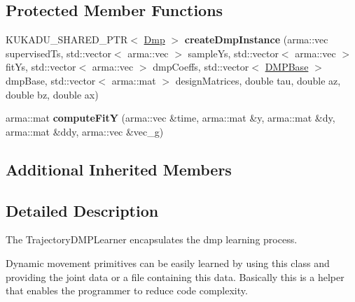 \subsection*{Protected Member Functions}
\begin{DoxyCompactItemize}
\item 
\hypertarget{classkukadu_1_1JointDMPLearner_ac16e6c7d24bbdf194663bdc61788d5ea}{K\-U\-K\-A\-D\-U\-\_\-\-S\-H\-A\-R\-E\-D\-\_\-\-P\-T\-R$<$ \hyperlink{classkukadu_1_1Dmp}{Dmp} $>$ {\bfseries create\-Dmp\-Instance} (arma\-::vec supervised\-Ts, std\-::vector$<$ arma\-::vec $>$ sample\-Ys, std\-::vector$<$ arma\-::vec $>$ fit\-Ys, std\-::vector$<$ arma\-::vec $>$ dmp\-Coeffs, std\-::vector$<$ \hyperlink{classkukadu_1_1DMPBase}{D\-M\-P\-Base} $>$ dmp\-Base, std\-::vector$<$ arma\-::mat $>$ design\-Matrices, double tau, double az, double bz, double ax)}\label{classkukadu_1_1JointDMPLearner_ac16e6c7d24bbdf194663bdc61788d5ea}

\item 
\hypertarget{classkukadu_1_1JointDMPLearner_a9d5c78a2aa1329efd24baf9fec767021}{arma\-::mat {\bfseries compute\-Fit\-Y} (arma\-::vec \&time, arma\-::mat \&y, arma\-::mat \&dy, arma\-::mat \&ddy, arma\-::vec \&vec\-\_\-g)}\label{classkukadu_1_1JointDMPLearner_a9d5c78a2aa1329efd24baf9fec767021}

\end{DoxyCompactItemize}
\subsection*{Additional Inherited Members}


\subsection{Detailed Description}
The Trajectory\-D\-M\-P\-Learner encapsulates the dmp learning process. 

Dynamic movement primitives can be easily learned by using this class and providing the joint data or a file containing this data. Basically this is a helper that enables the programmer to reduce code complexity. 

